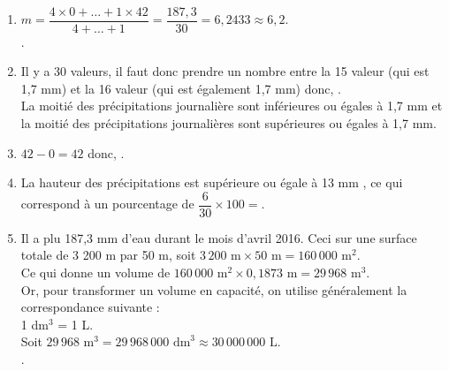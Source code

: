 \ \\ [-5mm]
\begin{enumerate}
   \item $m =\dfrac{4\times0+\dots+1\times42}{4+\dots+1} =\dfrac{187,3}{30} =6,2433 \approx 6,2$. \\ [1mm]
   .
   \item Il y a 30 valeurs, il faut donc prendre un nombre entre la 15 valeur (qui est 1,7 mm) et la 16 valeur (qui est également 1,7 mm) donc, . \\
   La moitié des précipitations journalière sont inférieures ou égales à 1,7 mm et la moitié des précipitations journalières sont supérieures ou égales à 1,7 mm.
   \item $42-0 =42$ donc, .
      \item La hauteur des précipitations est supérieure ou égale à 13 mm , ce qui correspond à un pourcentage de $\dfrac{6}{30}\times100 =$. \\ [1mm]
      \item Il a plu 187,3 mm d'eau durant le mois d'avril 2016. Ceci sur une surface totale de 3 200 m par 50 m, soit $3\,200\text{ m}\times50\text{ m} =160\, 000\text{ m}^2$. \\
      Ce qui donne un volume de $160\,000\text{ m}^2\times0,1873\text{ m} =29\,968\text{ m}^3$. \\
      Or, pour transformer un volume en capacité, on utilise généralement la correspondance suivante : \\
      1 dm$^3$ = 1 L. \\
      Soit $29\,968\text{ m}^3 =29\,968\,000\text{ dm}^3\approx 30\,000\,000\text{ L}$. \\
      . \\ [5mm]
\end{enumerate}
